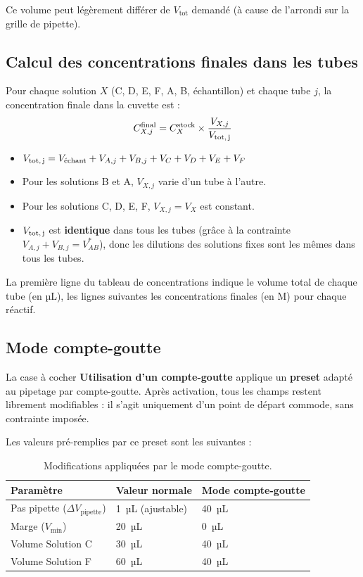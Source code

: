 \documentclass[12pt, a4paper]{article}
\begin{document}
Ce volume peut légèrement différer de $V_\text{tot}$ demandé (à cause de
l'arrondi sur la grille de pipette).

\subsection{Calcul des concentrations finales dans les tubes}

Pour chaque solution $X$ (C, D, E, F, A, B, échantillon) et chaque tube $j$,
la concentration finale dans la cuvette est :
\[
C_{X,j}^\text{final} = C_X^\text{stock} \times \frac{V_{X,j}}{V_\text{tot,\,j}}
\]

\begin{itemize}
  \item $V_\text{tot,\,j} = V_\text{échant} + V_{A,j} + V_{B,j} + V_C + V_D + V_E + V_F$
  \item Pour les solutions B et A, $V_{X,j}$ varie d'un tube à l'autre.
  \item Pour les solutions C, D, E, F, $V_{X,j} = V_X$ est constant.
  \item $V_\text{tot,\,j}$ est \textbf{identique} dans tous les tubes (grâce
        à la contrainte $V_{A,j} + V_{B,j} = V_{AB}^*$), donc les dilutions
        des solutions fixes sont les mêmes dans tous les tubes.
\end{itemize}

La première ligne du tableau de concentrations indique le volume total de
chaque tube (en µL), les lignes suivantes les concentrations finales (en M)
pour chaque réactif.

\subsection{Mode compte-goutte}

La case à cocher \textbf{Utilisation d'un compte-goutte} applique un
\textbf{preset} adapté au pipetage par compte-goutte. Après activation,
tous les champs restent librement modifiables : il s'agit uniquement d'un
point de départ commode, sans contrainte imposée.

Les valeurs pré-remplies par ce preset sont les suivantes :

\begin{table}[h!]
  \centering
  \caption{Modifications appliquées par le mode compte-goutte.}
  \label{tab:dropper}
  \begin{tabular}{lll}
    \toprule
    \textbf{Paramètre} & \textbf{Valeur normale} & \textbf{Mode compte-goutte} \\
    \midrule
    Pas pipette ($\Delta V_\text{pipette}$) & 1~µL (ajustable) & 40~µL \\
    Marge ($V_\text{min}$)                 & 20~µL            & 0~µL  \\
    Volume Solution C                      & 30~µL            & 40~µL \\
    Volume Solution F                      & 60~µL            & 40~µL \\
    \bottomrule
  \end{tabular}
\end{table}
\end{document}
